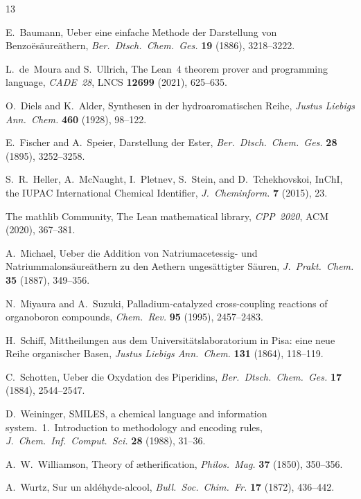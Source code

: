 \documentclass[11pt,a4paper]{article}
\theoremstyle{plain}
\theoremstyle{definition}
\theoremstyle{remark}
\begin{document}
\begin{thebibliography}{13}

  E.~Baumann,
  Ueber eine einfache Methode der Darstellung von Benzo\"es\"aure\"athern,
  \emph{Ber.\ Dtsch.\ Chem.\ Ges.} \textbf{19} (1886), 3218--3222.

  L.~de~Moura and S.~Ullrich,
  The Lean~4 theorem prover and programming language, \emph{CADE~28}, LNCS \textbf{12699}
  (2021), 625--635.

  O.~Diels and K.~Alder,
  Synthesen in der hydroaromatischen Reihe, \emph{Justus Liebigs Ann.\ Chem.} \textbf{460}
  (1928), 98--122.

  E.~Fischer and A.~Speier,
  Darstellung der Ester, \emph{Ber.\ Dtsch.\ Chem.\ Ges.} \textbf{28} (1895), 3252--3258.

  S.~R.~Heller, A.~McNaught, I.~Pletnev, S.~Stein, and D.~Tchekhovskoi,
  InChI, the IUPAC International Chemical Identifier, \emph{J.\ Cheminform.} \textbf{7} (2015), 23.

  The mathlib Community,
  The Lean mathematical library, \emph{CPP~2020}, ACM (2020), 367--381.

  A.~Michael,
  Ueber die Addition von Natriumacetessig- und Natriummalons\"aure\"athern zu den Aethern
  unges\"attigter S\"auren, \emph{J.\ Prakt.\ Chem.} \textbf{35} (1887), 349--356.

  N.~Miyaura and A.~Suzuki,
  Palladium-catalyzed cross-coupling reactions of organoboron compounds, \emph{Chem.\ Rev.}
  \textbf{95} (1995), 2457--2483.

  H.~Schiff,
  Mittheilungen aus dem Universit\"atslaboratorium in Pisa: eine neue Reihe organischer Basen,
  \emph{Justus Liebigs Ann.\ Chem.} \textbf{131} (1864), 118--119.

  C.~Schotten,
  Ueber die Oxydation des Piperidins,
  \emph{Ber.\ Dtsch.\ Chem.\ Ges.} \textbf{17} (1884), 2544--2547.

  D.~Weininger,
  SMILES, a chemical language and information system.\ 1.\ Introduction to methodology and encoding
  rules, \emph{J.\ Chem.\ Inf.\ Comput.\ Sci.} \textbf{28} (1988), 31--36.

  A.~W.~Williamson,
  Theory of \ae{}therification, \emph{Philos.\ Mag.} \textbf{37} (1850), 350--356.

  A.~Wurtz,
  Sur un ald\'ehyde-alcool,
  \emph{Bull.\ Soc.\ Chim.\ Fr.} \textbf{17} (1872), 436--442.

\end{thebibliography}
\end{document}
